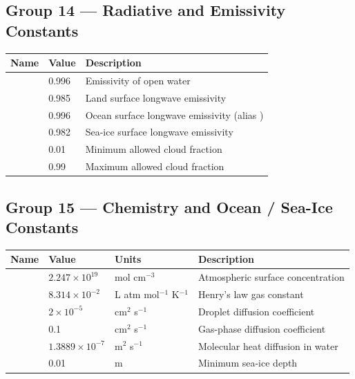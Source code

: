 \subsection{Group 14 --- Radiative and Emissivity Constants}

\begin{longtable}{L{3.5cm} L{3cm} L{7.5cm}}
  \toprule
  \textbf{Name} & \textbf{Value} & \textbf{Description} \\
  \midrule
  \endhead
  \bottomrule
  \endfoot
           & 0.996  & Emissivity of open water \\
  & 0.985  & Land surface longwave emissivity \\
  & 0.996  & Ocean surface longwave emissivity (alias ) \\
  & 0.982  & Sea-ice surface longwave emissivity \\
         & 0.01   & Minimum allowed cloud fraction \\
          & 0.99   & Maximum allowed cloud fraction \\
\end{longtable}

\subsection{Group 15 --- Chemistry and Ocean / Sea-Ice Constants}

\begin{longtable}{L{3.5cm} L{4cm} L{3cm} L{4cm}}
  \toprule
  \textbf{Name} & \textbf{Value} & \textbf{Units} & \textbf{Description} \\
  \midrule
  \endhead
  \bottomrule
  \endfoot
     & $2.247\times10^{19}$ & mol cm$^{-3}$ & Atmospheric surface concentration \\
     & $8.314\times10^{-2}$ & L atm mol$^{-1}$ K$^{-1}$ & Henry's law gas constant \\
   & $2\times10^{-5}$     & cm$^2$ s$^{-1}$ & Droplet diffusion coefficient \\
    & 0.1                  & cm$^2$ s$^{-1}$ & Gas-phase diffusion coefficient \\
      & $1.3889\times10^{-7}$& m$^2$ s$^{-1}$ & Molecular heat diffusion in water \\
   & 0.01                 & m               & Minimum sea-ice depth \\
\end{longtable}

